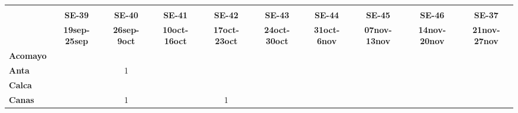 \begin{tabular}{lccccccccc}
	\textbf{}              & \multicolumn{1}{l}{}                        & \multicolumn{1}{l}{}      & \multicolumn{1}{l}{}                         & \multicolumn{1}{l}{}                         & \multicolumn{1}{l}{}                         & \multicolumn{1}{l}{}                        & \multicolumn{1}{l}{}                         & \multicolumn{1}{l}{}                         & \multicolumn{1}{l}{}     \\
	\textbf{}                                                               
	&\textbf{SE-39}                   			 &\textbf{SE-40}                   
	&\textbf{SE-41}                              &\textbf{SE-42}                   &\textbf{SE-43}                  
	&\textbf{SE-44} 
	&\textbf{SE-45} 							&\textbf{SE-46} 
	&\textbf{SE-37}\\
	\textbf{}             
	&\textbf{19sep-25sep} 		   	   			&\textbf{26sep-9oct}  						&\textbf{10oct-16oct} 
	&\textbf{17oct-23oct} 						&\textbf{24oct-30oct} 		       &\textbf{31oct-6nov}  						&\textbf{07nov-13nov} 
	&\textbf{14nov-20nov} 						&\textbf{21nov-27nov}\\
	\textbf{Acomayo}                        	
	&\cellcolor[HTML]{FCC46C}          			&\cellcolor[HTML]{FCC46C}     	    		&\cellcolor[HTML]{FCC46C}                   &\cellcolor[HTML]{FCC46C}          			&\cellcolor[HTML]{FCC46C}                  
	&\cellcolor[HTML]{FCC46C}  			        &\cellcolor[HTML]{FCC46C}          &\cellcolor[HTML]{FCC46C} 					&\cellcolor[HTML]{FCC46C}\\
	\textbf{Anta}                                                                    
	&\cellcolor[HTML]{FCC46C}         			&1                   					
	& \cellcolor[HTML]{FCC46C}                  &\cellcolor[HTML]{FCC46C}         &\cellcolor[HTML]{FCC46C} 			    
	& \cellcolor[HTML]{FCC46C} 				    &\cellcolor[HTML]{FCC46C}		  &\cellcolor[HTML]{FCC46C}					&\cellcolor[HTML]{FCC46C}\\
	\textbf{Calca}      				       
	&\cellcolor[HTML]{FCC46C}         			&\cellcolor[HTML]{FCC46C}       
	&\cellcolor[HTML]{FCC46C}                   &\cellcolor[HTML]{FCC46C}         &\cellcolor[HTML]{FCC46C}                
	&\cellcolor[HTML]{FCC46C}                   &\cellcolor[HTML]{FCC46C}  		  &\cellcolor[HTML]{FCC46C} 					&\cellcolor[HTML]{FCC46C} \\                										
	\textbf{Canas}                              
	&\cellcolor[HTML]{FCC46C}         			&1                   &\cellcolor[HTML]{FCC46C}                   &1        			              &\cellcolor[HTML]{FCC46C}                   &\cellcolor[HTML]{FCC46C} 					&\cellcolor[HTML]{FCC46C}         			&\cellcolor[HTML]{FCC46C} 

\end{tabular}
